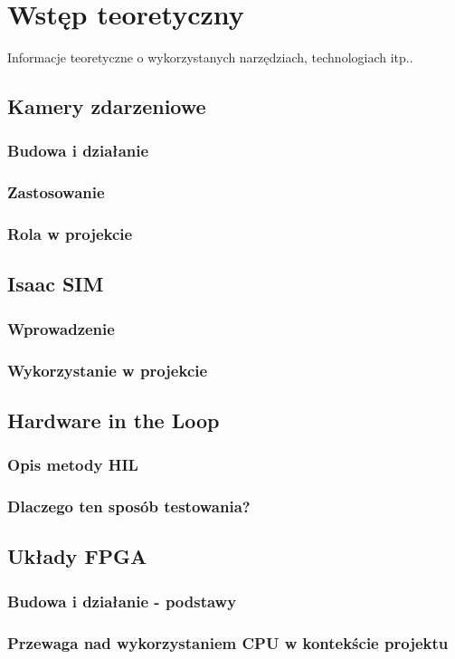 \chapter{Wstęp teoretyczny}
\label{cha:wstep}

Informacje teoretyczne o wykorzystanych narzędziach, technologiach itp..


\section{Kamery zdarzeniowe}
\label{sec:kamery_zdarzeniowe}

\subsection{Budowa i działanie}

\subsection{Zastosowanie}

\subsection{Rola w projekcie}

\section{Isaac SIM}
\label{sec:isaac_sim}

\subsection{Wprowadzenie}

\subsection{Wykorzystanie w projekcie}

\section{Hardware in the Loop}
\label{sec:hil}

\subsection{Opis metody HIL}

\subsection{Dlaczego ten sposób testowania?}

\section{Układy FPGA}
\label{sec:fpga}

\subsection{Budowa i działanie - podstawy}

\subsection{Przewaga nad wykorzystaniem CPU w kontekście projektu}



